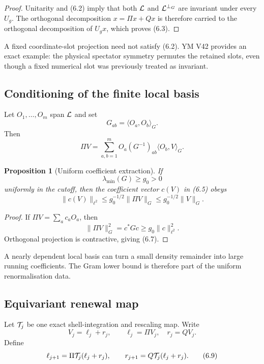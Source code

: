 \documentclass[11pt]{article}
\newtheorem{proposition}[theorem]{Proposition}
\theoremstyle{remark}
\begin{document}
\begin{proof}
Unitarity and (6.2) imply that both \({\cal L}\) and
\({\cal L}^{\perp_G}\) are invariant under every \(U_g\).
The orthogonal decomposition
\(x=\Pi x+Qx\) is therefore carried to the orthogonal decomposition
of \(U_gx\), which proves (6.3).
\end{proof}

A fixed coordinate-slot projection need not satisfy (6.2).  YM V42
provides an exact example: the physical spectator symmetry permutes
the retained slots, even though a fixed numerical slot was previously
treated as invariant.

\subsection{Conditioning of the finite local basis}

Let \(O_1,\ldots,O_m\) span \({\cal L}\) and set
\[
                              G_{ab}=\langle O_a,O_b\rangle_G. \tag{6.4}
\]
Then
\[
                 \Pi V=\sum_{a,b=1}^m
                       O_a(G^{-1})_{ab}\langle O_b,V\rangle_G.
                                                                    \tag{6.5}
\]

\begin{proposition}[Uniform coefficient extraction]
\label{prop:v12v6-gram}
If
\[
                              \lambda_{\min}(G)\ge g_0>0     \tag{6.6}
\]
uniformly in the cutoff, then the coefficient vector \(c(V)\) in
(6.5) obeys
\[
                              \|c(V)\|_{\ell^2}
                              \le g_0^{-1/2}\|\Pi V\|_G
                              \le g_0^{-1/2}\|V\|_G.          \tag{6.7}
\]
\end{proposition}

\begin{proof}
If \(\Pi V=\sum_ac_aO_a\), then
\[
 \|\Pi V\|_G^2=c^*Gc\ge g_0\|c\|_{\ell^2}^2.
\]
Orthogonal projection is contractive, giving (6.7).
\end{proof}

A nearly dependent local basis can turn a small density remainder
into large running coefficients.  The Gram lower bound is therefore
part of the uniform renormalisation data.

\subsection{Equivariant renewal map}

Let \({\cal T}_j\) be one exact shell-integration and rescaling map.
Write
\[
                              V_j=\ell_j+r_j,\qquad
 \ell_j=\Pi V_j,\quad r_j=QV_j.                              \tag{6.8}
\]
Define
\[
 \ell_{j+1}=\Pi{\cal T}_j(\ell_j+r_j),\qquad
 r_{j+1}=Q{\cal T}_j(\ell_j+r_j).                            \tag{6.9}
\]
\end{document}

